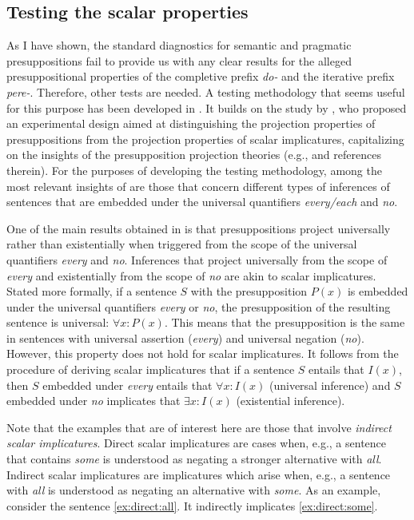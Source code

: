 \subsection{Testing the scalar properties}\label{sec:chemla}
As I have shown, the standard diagnostics for semantic and pragmatic presuppositions fail to provide us with any clear results for the alleged presuppositional properties of the completive prefix \textit{do-} and the iterative prefix \textit{pere-}. Therefore, other tests are needed. A testing methodology that seems useful for this purpose has been developed in \citealt{ZinovaFilip:SALT}. It builds on the study by \citet{Chemla:09}, who proposed an experimental design aimed at distinguishing the projection properties of presuppositions from the projection properties of scalar implicatures, capitalizing on the insights of the presupposition projection theories (e.g., \citealp{Heim:83, Schlenker:08} and references therein). For the purposes of developing the testing methodology, among the most relevant insights of \citet{Chemla:09} are those that concern different types of inferences of sentences that are embedded under the universal quantifiers \textit{every/each} and \textit{no}.

One of the main results obtained in \citealt{Chemla:09} is that presuppositions project universally rather than existentially when triggered from the scope of the universal quantifiers \textit{every} and \textit{no}. Inferences that project universally from the scope of \textit{every} and existentially from the scope of \textit{no} are akin to scalar implicatures. Stated more formally, if a sentence $S$ with the presupposition $P(x)$ is embedded under the universal quantifiers \textit{every} or \textit{no}, the presupposition of the resulting sentence is universal: $\forall x : P(x)$. This means that the presupposition is the same in sentences with universal assertion (\textit{every}) and universal negation (\textit{no}). However, this property does not hold for scalar implicatures. It follows from the procedure of deriving scalar implicatures that if a sentence $S$ entails that $I(x)$, then $S$ embedded under \textit{every} entails that $\forall x: I(x)$ (universal inference) and $S$ embedded under \textit{no} implicates that $\exists x: I(x)$ (existential inference).

Note that the examples that are of interest here are those that involve \textit{indirect scalar implicatures}. Direct scalar implicatures are cases when, e.g., a sentence that contains \textit{some} is understood as negating a stronger alternative with \textit{all}. Indirect scalar implicatures are implicatures which arise when, e.g., a sentence with \textit{all} is understood as negating an alternative with \textit{some}. As an example, consider the sentence \ref{ex:direct:all}. It indirectly implicates \ref{ex:direct:some}.

